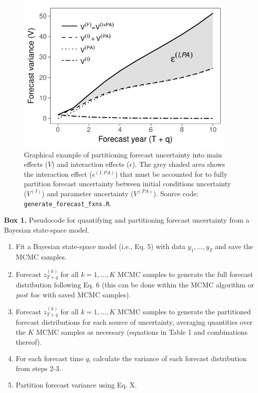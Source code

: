 \documentclass[12pt,]{article}
\begin{document}
\begin{figure}
\centering
\includegraphics[width=\textwidth,height=3in]{../figures/example_interaction_effect.pdf}
\caption{Graphical example of partitioning forecast uncertainty into
main effects (\(V\)) and interaction effects (\(\epsilon\)). The grey
shaded area shows the interaction effect (\(\epsilon^{(I,PA)}\)) that
must be accounted for to fully partition forecast uncertainty between
initial conditions uncertainty (\(V^{(I)}\)) and parameter uncertainty
(\(V^{(PA)}\)). Source code: \texttt{generate\_forecast\_fxns.R}.}
\end{figure}

\begin{Box}
  \renewcommand{\arraystretch}{1.04}
  \caption{}
  \textbf{Box 1.} Pseudocode for quantifying and partitioning forecast uncertainty from a Bayesian state-space model. 
  \vspace{1em}
  \begin{enumerate}
    \item Fit a Bayesian state-space model (i.e., Eq. 5) with data $y_1,\dots,y_T$ and save the MCMC samples.
    \item Forecast $z_{T+q}^{(k)}$ for all $k = 1,\dots,K$ MCMC samples to generate the full forecast distribution following Eq. 6 (this can be done within the MCMC algorithm or \emph{post hoc} with saved MCMC samples).
    \item Forecast $z_{T+q}^{(k)}$ for all $k = 1,\dots,K$ MCMC samples to generate the partitioned forecast distributions for each source of uncertainty, averaging quantities over the $K$ MCMC samples as necessary (equations in Table 1 and combinations thereof).
    \item For each forecast time $q$, calculate the variance of each forecast distribution from steps 2-3.
    \item Partition forecast variance using Eq. X.
  \end{enumerate}
  \renewcommand{\arraystretch}{1.0}
\end{Box}
\end{document}
